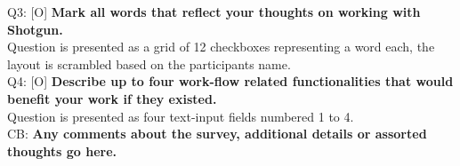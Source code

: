   Q3: [O] \textbf{%
    Mark all words that reflect your thoughts on working with \\Shotgun.
  } \\
  Question is presented as a grid of 12 checkboxes representing a word each, the
  layout is scrambled based on the participants name. \\

  Q4: [O] \textbf{%
    Describe up to four work-flow related functionalities that would benefit
    your work if they existed.
  } \\
  Question is presented as four text-input fields numbered 1 to 4.\\

  CB: \textbf{%
    Any comments about the survey, additional details or assorted thoughts
    go here.
  }\\



